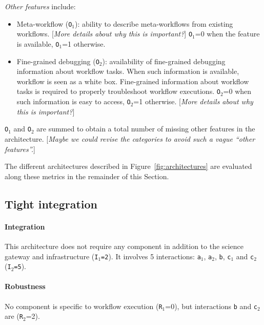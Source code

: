 \documentclass[preprint,3p,twocolumn]{elsarticle}
\newcommand{\todo}[1]{\color{blue}\xspace[\emph{#1}]\xspace\color{black}}
\begin{document}
\emph{Other features} include:
\begin{itemize}[leftmargin=0cm,itemindent=0.35cm,itemsep=0cm]
\item Meta-workflow (\texttt{O$_1$}): ability to describe
  meta-workflows from existing workflows.  \todo{More details about
    why this is important?} \texttt{O$_1$}=0 when the feature is
  available, \texttt{O$_1$}=1 otherwise.
\item Fine-grained debugging (\texttt{O$_2$}): availability of
  fine-grained debugging information about workflow tasks. When
  such information is available, workflow is seen as a white
  box. Fine-grained information about workflow tasks is required to
  properly troubleshoot workflow executions.  \texttt{O$_2$}=0 when
  such information is easy to access, \texttt{O$_2$}=1
  otherwise. \todo{More details about why this is important?}
\end{itemize}
\texttt{O$_1$} and \texttt{O$_2$} are summed to obtain a total number of missing other
features in the architecture.  \todo{Maybe we could revise the
  categories to avoid such a vague ``other features''.}


The different architectures described in
Figure~\ref{fig:architectures} are evaluated along these metrics in
the remainder of this Section.

\subsection{Tight integration}

\paragraph{Integration} This architecture does not require any
component in addition to the science gateway and infrastructure
(\texttt{I$_1$=2}). It involves 5 interactions: \texttt{a$_1$},
\texttt{a$_2$}, \texttt{b}, \texttt{c$_1$} and \texttt{c$_2$}
(\texttt{I$_2$=5}).

\paragraph{Robustness} No component is specific to workflow execution
(\texttt{R$_1$}=0), but interactions \texttt{b} and \texttt{c$_2$} are
(\texttt{R$_2$}=2).
\end{document}
